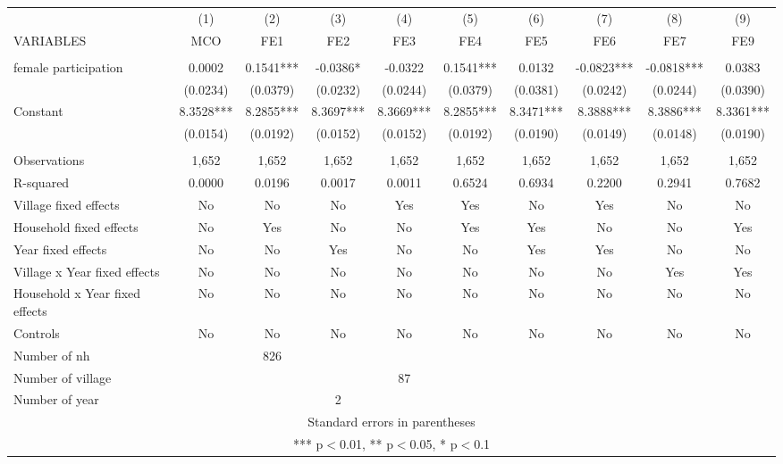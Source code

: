 \documentclass[]{article}
\begin{document}
\begin{tabular}{lccccccccc} \hline
 & (1) & (2) & (3) & (4) & (5) & (6) & (7) & (8) & (9) \\
VARIABLES & MCO & FE1 & FE2 & FE3 & FE4 & FE5 & FE6 & FE7 & FE9 \\ \hline
 &  &  &  &  &  &  &  &  &  \\
female participation & 0.0002 & 0.1541*** & -0.0386* & -0.0322 & 0.1541*** & 0.0132 & -0.0823*** & -0.0818*** & 0.0383 \\
 & (0.0234) & (0.0379) & (0.0232) & (0.0244) & (0.0379) & (0.0381) & (0.0242) & (0.0244) & (0.0390) \\
Constant & 8.3528*** & 8.2855*** & 8.3697*** & 8.3669*** & 8.2855*** & 8.3471*** & 8.3888*** & 8.3886*** & 8.3361*** \\
 & (0.0154) & (0.0192) & (0.0152) & (0.0152) & (0.0192) & (0.0190) & (0.0149) & (0.0148) & (0.0190) \\
 &  &  &  &  &  &  &  &  &  \\
Observations & 1,652 & 1,652 & 1,652 & 1,652 & 1,652 & 1,652 & 1,652 & 1,652 & 1,652 \\
R-squared & 0.0000 & 0.0196 & 0.0017 & 0.0011 & 0.6524 & 0.6934 & 0.2200 & 0.2941 & 0.7682 \\
Village fixed effects & No & No & No & Yes & Yes & No & Yes & No & No \\
Household fixed effects & No & Yes & No & No & Yes & Yes & No & No & Yes \\
Year fixed effects & No & No & Yes & No & No & Yes & Yes & No & No \\
Village x Year fixed effects & No & No & No & No & No & No & No & Yes & Yes \\
Household x Year fixed effects & No & No & No & No & No & No & No & No & No \\
Controls & No & No & No & No & No & No & No & No & No \\
Number of nh &  & 826 &  &  &  &  &  &  &  \\
Number of village &  &  &  & 87 &  &  &  &  &  \\
 Number of year &  &  & 2 &  &  &  &  &  &  \\ \hline
\multicolumn{10}{c}{ Standard errors in parentheses} \\
\multicolumn{10}{c}{ *** p$<$0.01, ** p$<$0.05, * p$<$0.1} \\
\end{tabular}
\end{document}
